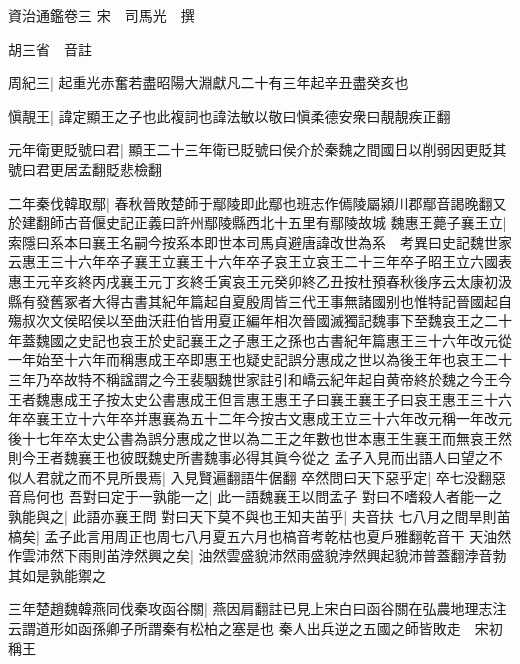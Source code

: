 資治通鑑卷三
宋　司馬光　撰

胡三省　音註

周紀三|{
	起重光赤奮若盡昭陽大淵獻凡二十有三年起辛丑盡癸亥也}


愼靚王|{
	諱定顯王之子也此複詞也諱法敏以敬曰愼柔德安衆曰靚靚疾正翻}


元年衛更貶號曰君|{
	顯王二十三年衛已貶號曰侯介於秦魏之間國日以削弱因更貶其號曰君更居孟翻貶悲檢翻}


二年秦伐韓取鄢|{
	春秋晉敗楚師于鄢陵即此鄢也班志作傿陵屬潁川郡鄢音謁晚翻又於建翻師古音偃史記正義曰許州鄢陵縣西北十五里有鄢陵故城}
魏惠王薨子襄王立|{
	索隱曰系本曰襄王名嗣今按系本即世本司馬貞避唐諱改世為系　考異曰史記魏世家云惠王三十六年卒子襄王立襄王十六年卒子哀王立哀王二十三年卒子昭王立六國表惠王元辛亥終丙戌襄王元丁亥終壬寅哀王元癸卯終乙丑按杜預春秋後序云太康初汲縣有發舊冢者大得古書其紀年篇起自夏殷周皆三代王事無諸國别也惟特記晉國起自殤叔次文侯昭侯以至曲沃莊伯皆用夏正編年相次晉國滅獨記魏事下至魏哀王之二十年蓋魏國之史記也哀王於史記襄王之子惠王之孫也古書紀年篇惠王三十六年改元從一年始至十六年而稱惠成王卒即惠王也疑史記誤分惠成之世以為後王年也哀王二十三年乃卒故特不稱諡謂之今王裴駰魏世家註引和嶠云紀年起自黄帝終於魏之今王今王者魏惠成王子按太史公書惠成王但言惠王惠王子曰襄王襄王子曰哀王惠王三十六年卒襄王立十六年卒并惠襄為五十二年今按古文惠成王立三十六年改元稱一年改元後十七年卒太史公書為誤分惠成之世以為二王之年數也世本惠王生襄王而無哀王然則今王者魏襄王也彼既魏史所書魏事必得其眞今從之}
孟子入見而出語人曰望之不似人君就之而不見所畏焉|{
	入見賢遍翻語牛倨翻}
卒然問曰天下惡乎定|{
	卒七没翻惡音烏何也}
吾對曰定于一孰能一之|{
	此一語魏襄王以問孟子}
對曰不嗜殺人者能一之孰能與之|{
	此語亦襄王問}
對曰天下莫不與也王知夫苖乎|{
	夫音扶}
七八月之間旱則苖槁矣|{
	孟子此言用周正也周七八月夏五六月也槁音考乾枯也夏戶雅翻乾音干}
天油然作雲沛然下雨則苖浡然興之矣|{
	油然雲盛貌沛然雨盛貌浡然興起貌沛普蓋翻浡音勃}
其如是孰能禦之

三年楚趙魏韓燕同伐秦攻函谷關|{
	燕因肩翻註已見上宋白曰函谷關在弘農地理志注云謂道形如函孫卿子所謂秦有松柏之塞是也}
秦人出兵逆之五國之師皆敗走　宋初稱王

